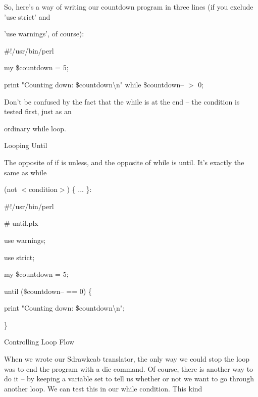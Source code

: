 \documentclass[a4paper,11pt]{book}
\begin{document}
\noindent 

\noindent So, here's a way of writing our countdown program in three lines (if you exclude 'use strict' and

\noindent 'use warnings', of course):

\noindent 

\noindent 

\noindent \#!/usr/bin/perl

\noindent my \$countdown = 5;

\noindent print "Counting down: \$countdown\textbackslash n" while \$countdown-- $>$ 0;

\noindent 

\noindent 

\noindent Don't be confused by the fact that the while is at the end -- the condition is tested first, just as an

\noindent ordinary while loop.

\noindent 

\noindent Looping Until

\noindent 

\noindent The opposite of if is unless, and the opposite of while is until. It's exactly the same as while

\noindent (not $<$condition$>$) \{ ... \}:

\noindent 

\noindent 

\noindent \#!/usr/bin/perl

\noindent \# until.plx

\noindent use warnings;

\noindent use strict;

\noindent 

\noindent my \$countdown = 5;

\noindent 

\noindent until (\$countdown-- == 0) \{

\noindent print "Counting down: \$countdown\textbackslash n";

\noindent \}

\noindent 

\noindent 

\noindent Controlling Loop Flow

\noindent 

\noindent When we wrote our Sdrawkcab translator, the only way we could stop the loop was to end the program with a die command. Of course, there is another way to do it -- by keeping a variable set to tell us whether or not we want to go through another loop. We can test this in our while condition. This kind
\end{document}
